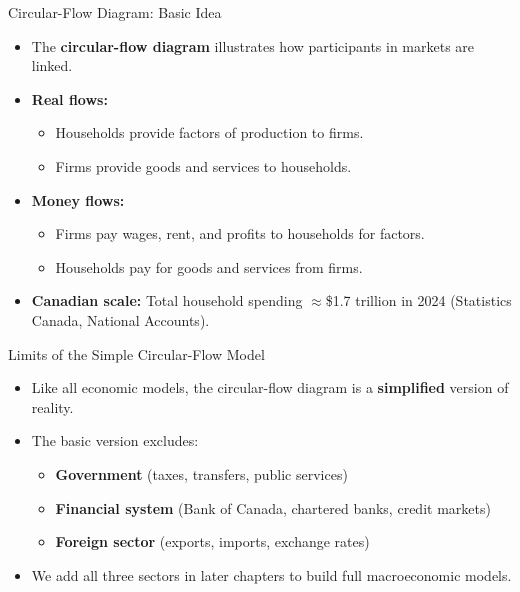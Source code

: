 \documentclass[aspectratio=169]{beamer}
\begin{document}
\begin{frame}{Circular-Flow Diagram: Basic Idea}
\transfade
\begin{itemize}[<+->]
  \item The \textbf{circular-flow diagram} illustrates how participants in markets are linked.
  \item \textbf{Real flows:}
  \begin{itemize}[<+->]
    \item Households provide factors of production to firms.
    \item Firms provide goods and services to households.
  \end{itemize}
  \item \textbf{Money flows:}
  \begin{itemize}[<+->]
    \item Firms pay wages, rent, and profits to households for factors.
    \item Households pay for goods and services from firms.
  \end{itemize}
  \item \textbf{Canadian scale:} Total household spending $\approx$\$1.7 trillion in 2024 (Statistics Canada, National Accounts).
\end{itemize}
\end{frame}

\begin{frame}{Limits of the Simple Circular-Flow Model}
\transfade
\begin{itemize}[<+->]
  \item Like all economic models, the circular-flow diagram is a \textbf{simplified} version of reality.
  \item The basic version excludes:
  \begin{itemize}[<+->]
    \item \textbf{Government} (taxes, transfers, public services)
    \item \textbf{Financial system} (Bank of Canada, chartered banks, credit markets)
    \item \textbf{Foreign sector} (exports, imports, exchange rates)
  \end{itemize}
  \item We add all three sectors in later chapters to build full macroeconomic models.
\end{itemize}
\end{frame}
\end{document}
